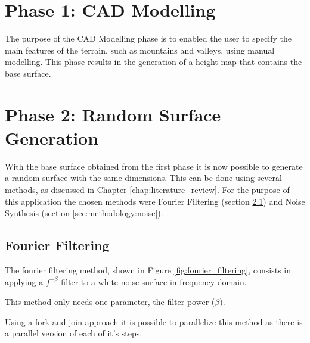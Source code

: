 \section {Phase 1: CAD Modelling} \label{sec:methodology:phase1}

The purpose of the CAD Modelling phase is to enabled the user to specify the main features of the terrain, such as mountains and valleys, using manual modelling. This phase results in the generation of a height map that contains the base surface.

\section{Phase 2: Random Surface Generation} \label{sec:methodology:phase2}

With the base surface obtained from the first phase it is now possible to generate a random surface with the same dimensions. This can be done using several methods, as discussed in Chapter \ref{chap:literature_review}. For the purpose of this application the chosen methods were Fourier Filtering (section \ref{sec:methodology:fourier}) and Noise Synthesis (section \ref{sec:methodology:noise}).


  \subsection{Fourier Filtering} \label{sec:methodology:fourier}
    
    The fourier filtering method, shown in Figure \ref{fig:fourier_filtering}, consists in applying a $f^{-\beta}$ filter to a white noise surface in frequency domain. 
    
    This method only needs one parameter, the filter power ($\beta$).
    
    Using a fork and join approach it is possible to parallelize this method as there is a parallel version of each of it's steps.
    
